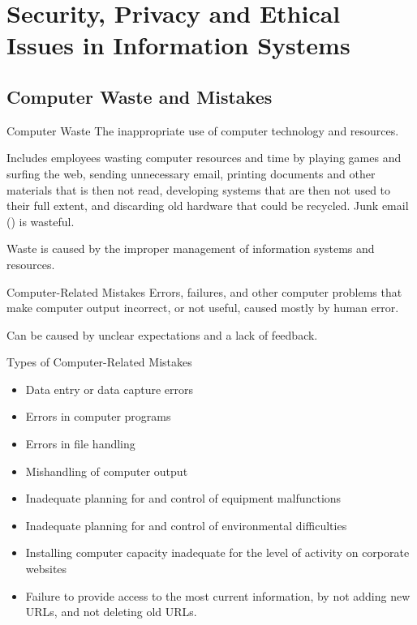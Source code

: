 \documentclass[\main/notes.tex]{subfiles}
\begin{document}
	\setcounter{chapter}{12}
	\chapter{Security, Privacy and Ethical Issues in Information Systems}
		\section{Computer Waste and Mistakes}
			\begin{definition}{Computer Waste}
				The inappropriate use of computer technology and resources.

				Includes employees wasting computer resources and time by playing games and surfing the web, sending unnecessary email, printing documents and other materials that is then not read, developing systems that are then not used to their full extent, and discarding old hardware that could be recycled. Junk email () is wasteful.

				Waste is caused by the improper management of information systems and resources.
			\end{definition}
			\begin{definition}{Computer-Related Mistakes}
				Errors, failures, and other computer problems that make computer output incorrect, or not useful, caused mostly by human error.

				Can be caused by unclear expectations and a lack of feedback.
			\end{definition}
			\begin{sidenote}{Types of Computer-Related Mistakes}
				\begin{itemize}[nosep]
					\item Data entry or data capture errors
					\item Errors in computer programs
					\item Errors in file handling
					\item Mishandling of computer output
					\item Inadequate planning for and control of equipment malfunctions
					\item Inadequate planning for and control of environmental difficulties
					\item Installing computer capacity inadequate for the level of activity on corporate websites
					\item Failure to provide access to the most current information, by not adding new URLs, and not deleting old URLs.
				\end{itemize}
			\end{sidenote}
\end{document}
